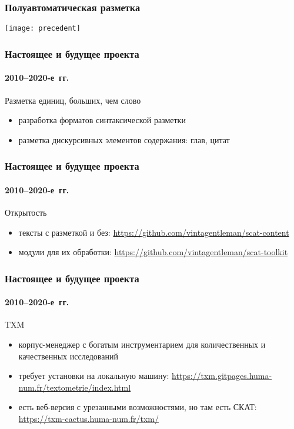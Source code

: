\begin{frame}
  \frametitle{Полуавтоматическая разметка}

  \begin{center}
    \texttt{[image: precedent]}
  \end{center}
\end{frame}

\begin{frame}
  \frametitle{Настоящее и будущее проекта}
  \framesubtitle{2010--2020-е~гг.}

  \begin{block}{Разметка единиц, больших, чем слово}
    \begin{itemize}
      \item разработка форматов синтаксической разметки\autocite{gorlov:2018}
      \item разметка дискурсивных элементов содержания: глав\autocite{rogozina:2015}, цитат\autocite{alexeeva:2019}
    \end{itemize}
  \end{block}
\end{frame}

\begin{frame}
  \frametitle{Настоящее и будущее проекта}
  \framesubtitle{2010--2020-е~гг.}

  \begin{block}{Открытость}
  \begin{itemize}
    \item тексты с разметкой и без: \url{https://github.com/vintagentleman/scat-content}
    \item модули для их обработки: \url{https://github.com/vintagentleman/scat-toolkit}
  \end{itemize}
  \end{block}
\end{frame}

\begin{frame}
  \frametitle{Настоящее и будущее проекта}
  \framesubtitle{2010--2020-е~гг.}

  \begin{block}{TXM}
    \begin{itemize}
      \item корпус-менеджер с богатым инструментарием для количественных и качественных исследований
      \item требует установки на локальную машину: \url{https://txm.gitpages.huma-num.fr/textometrie/index.html}
      \item есть веб-версия с урезанными возможностями, но там есть СКАТ: \url{https://txm-cactus.huma-num.fr/txm/}
    \end{itemize}
  \end{block}
\end{frame}
